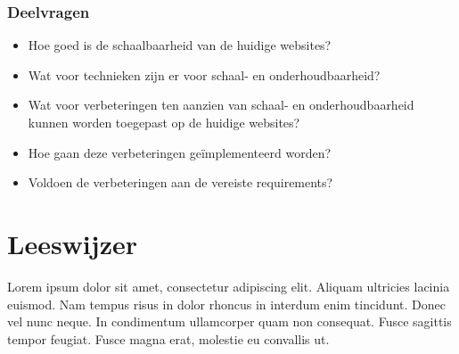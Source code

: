 \subsubsection{Deelvragen}
\begin{itemize}
	\item Hoe goed is de schaalbaarheid van de huidige websites?
	\item Wat voor technieken zijn er voor schaal- en onderhoudbaarheid?
	\item Wat voor verbeteringen ten aanzien van schaal- en onderhoudbaarheid kunnen worden toegepast op de huidige websites?
	\item Hoe gaan deze verbeteringen geïmplementeerd worden?
	\item Voldoen de verbeteringen aan de vereiste requirements?
\end{itemize}

\section{Leeswijzer}

Lorem ipsum dolor sit amet, consectetur adipiscing elit. Aliquam ultricies lacinia euismod. Nam tempus risus in dolor rhoncus in interdum enim tincidunt. Donec vel nunc neque. In condimentum ullamcorper quam non consequat. Fusce sagittis tempor feugiat. Fusce magna erat, molestie eu convallis ut.